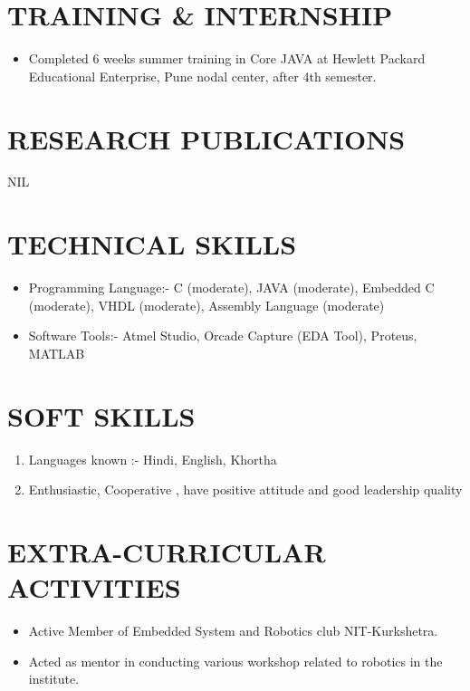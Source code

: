 \documentclass[11pt,a4paper,sans]{moderncv}
\begin{document}
\section{TRAINING \& INTERNSHIP}
\begin{itemize}
\item Completed 6 weeks summer training in Core JAVA at Hewlett Packard Educational Enterprise, Pune nodal center, after 4th semester.
\end{itemize}

\section{RESEARCH PUBLICATIONS}
NIL 
\newline \newline
\section{TECHNICAL SKILLS}
\begin{itemize}
\item Programming Language:- C (moderate), JAVA (moderate), Embedded C (moderate),  VHDL (moderate), Assembly Language (moderate)
\item Software Tools:- Atmel Studio,  Orcade Capture (EDA Tool), Proteus, MATLAB
\end{itemize}

\section{SOFT SKILLS}
\begin{enumerate}
\item Languages known :- Hindi, English, Khortha
\item Enthusiastic, Cooperative , have positive attitude and good leadership quality
\end{enumerate}


\section{EXTRA-CURRICULAR ACTIVITIES}
\begin{itemize}
\item Active Member of Embedded System and Robotics club NIT-Kurkshetra.
\item Acted as mentor in conducting various workshop related to robotics in the institute. 
\end{itemize}
\end{document}
